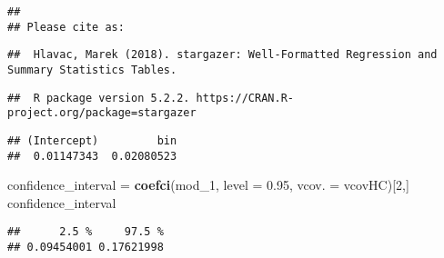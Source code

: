 \documentclass[
]{article}
\newenvironment{Shaded}{\begin{snugshade}}{\end{snugshade}}
\newcommand{\ControlFlowTok}[1]{\textcolor[rgb]{0.13,0.29,0.53}{\textbf{#1}}}
\newcommand{\DataTypeTok}[1]{\textcolor[rgb]{0.13,0.29,0.53}{#1}}
\newcommand{\DecValTok}[1]{\textcolor[rgb]{0.00,0.00,0.81}{#1}}
\newcommand{\FloatTok}[1]{\textcolor[rgb]{0.00,0.00,0.81}{#1}}
\newcommand{\KeywordTok}[1]{\textcolor[rgb]{0.13,0.29,0.53}{\textbf{#1}}}
\newcommand{\NormalTok}[1]{#1}
\newcommand{\OperatorTok}[1]{\textcolor[rgb]{0.81,0.36,0.00}{\textbf{#1}}}
\newcommand{\StringTok}[1]{\textcolor[rgb]{0.31,0.60,0.02}{#1}}
\begin{document}
\begin{verbatim}
## 
## Please cite as:
\end{verbatim}

\begin{verbatim}
##  Hlavac, Marek (2018). stargazer: Well-Formatted Regression and Summary Statistics Tables.
\end{verbatim}

\begin{verbatim}
##  R package version 5.2.2. https://CRAN.R-project.org/package=stargazer
\end{verbatim}

\begin{Shaded}
\end{Shaded}

\begin{verbatim}
## (Intercept)         bin 
##  0.01147343  0.02080523
\end{verbatim}

\begin{Shaded}
\begin{Highlighting}[]
\NormalTok{confidence_interval =}\StringTok{ }\KeywordTok{coefci}\NormalTok{(mod_}\DecValTok{1}\NormalTok{, }\DataTypeTok{level =} \FloatTok{0.95}\NormalTok{, }\DataTypeTok{vcov. =}\NormalTok{ vcovHC)[}\DecValTok{2}\NormalTok{,] }
\NormalTok{confidence_interval}
\end{Highlighting}
\end{Shaded}

\begin{verbatim}
##      2.5 %     97.5 % 
## 0.09454001 0.17621998
\end{verbatim}
\end{document}
